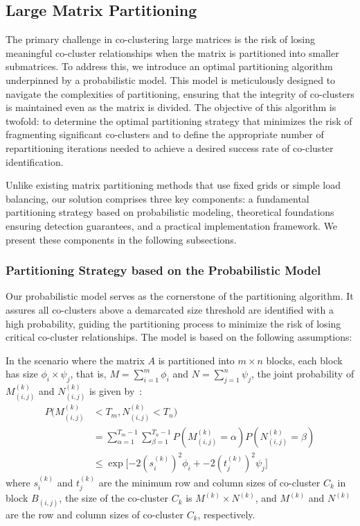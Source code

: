 \documentclass[journal]{IEEEtran}
\begin{document}
\subsection{Large Matrix Partitioning}
\label{subsec:large-matrix-partitioning}
The primary challenge in co-clustering large matrices is the risk of losing meaningful co-cluster relationships when the matrix is partitioned into smaller submatrices. To address this, we introduce an optimal partitioning algorithm underpinned by a probabilistic model. This model is meticulously designed to navigate the complexities of partitioning, ensuring that the integrity of co-clusters is maintained even as the matrix is divided. The objective of this algorithm is twofold: to determine the optimal partitioning strategy that minimizes the risk of fragmenting significant co-clusters and to define the appropriate number of repartitioning iterations needed to achieve a desired success rate of co-cluster identification.

    {\color{blue}Unlike existing matrix partitioning methods that use fixed grids or simple load balancing,  our solution comprises three key components: a fundamental partitioning strategy based on probabilistic modeling, theoretical foundations ensuring detection guarantees, and a practical implementation framework. We present these components in the following subsections.
    }
\subsubsection{Partitioning Strategy based on the Probabilistic Model}

Our probabilistic model serves as the cornerstone of the partitioning algorithm. It assures all co-clusters above a demarcated size threshold are identified with a high probability, guiding the partitioning process to minimize the risk of losing critical co-cluster relationships. The model is based on the following assumptions:

In the scenario where the matrix $A$ is partitioned into $m \times n$ blocks, each block has size $\phi_i \times \psi_j$, that is, $M=\sum_{i=1}^m \phi_i$ and $N=\sum_{j=1}^n \psi_j$, the joint probability of $M_{(i,j)}^{(k)}$ and $N_{(i,j)}^{(k)}$ is given by~:
\begin{equation}
    \begin{split}
        P(M_{(i,j)}^{(k)} & < T_m, N_{(i,j)}^{(k)} < T_n)                                                                           \\
                          & = \sum_{\alpha=1}^{T_m-1} \sum_{\beta=1}^{T_n-1} P(M_{(i,j)}^{(k)} = \alpha) P(N_{(i,j)}^{(k)} = \beta) \\
                          & \le \exp[-2 (s_i^{(k)})^2 \phi_i + -2 (t_j^{(k)})^2 \psi_j\rbrack
    \end{split}
\end{equation}
where $s_i^{(k)}$ and $t_j^{(k)}$ are the minimum row and column sizes of co-cluster $C_k$ in block $B_{(i,j)}$, the size of the co-cluster $C_k$ is $M^{(k)} \times N^{(k)}$, and $M^{(k)}$ and $N^{(k)}$ are the row and column sizes of co-cluster $C_k$, respectively.
\end{document}
